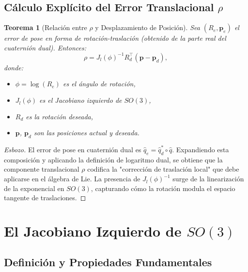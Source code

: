 \documentclass[11pt,a4paper]{article}
\newtheorem{theorem}{Teorema}[section]
\begin{document}
\subsection{Cálculo Explícito del Error Translacional $\rho$}

\begin{theorem}[Relación entre $\rho$ y Desplazamiento de Posición]
Sea $(R_e, \mathbf{p}_e)$ el error de pose en forma de rotación-traslación (obtenido de la parte real del cuaternión dual). Entonces:
\begin{equation}
    \rho = J_l(\phi)^{-1} R_d^\top (\mathbf{p} - \mathbf{p}_d),
    \label{eq:rho_jacobian}
\end{equation}
donde:
\begin{itemize}
    \item $\phi = \log(R_e)$ es el ángulo de rotación,
    \item $J_l(\phi)$ es el \emph{Jacobiano izquierdo} de $SO(3)$,
    \item $R_d$ es la rotación deseada,
    \item $\mathbf{p}$, $\mathbf{p}_d$ son las posiciones actual y deseada.
\end{itemize}
\end{theorem}

\begin{proof}[Esbozo]
El error de pose en cuaternión dual es $\hat{q}_e = \hat{q}_d^* \circ \hat{q}$. Expandiendo esta composición y aplicando la definición de logaritmo dual, se obtiene que la componente translacional $\rho$ codifica la "corrección de traslación local" que debe aplicarse en el álgebra de Lie. La presencia de $J_l(\phi)^{-1}$ surge de la linearización de la exponencial en $SO(3)$, capturando cómo la rotación modula el espacio tangente de traslaciones.
\end{proof}

\section{El Jacobiano Izquierdo de $SO(3)$}
\label{sec:left_jacobian}

\subsection{Definición y Propiedades Fundamentales}
\end{document}
